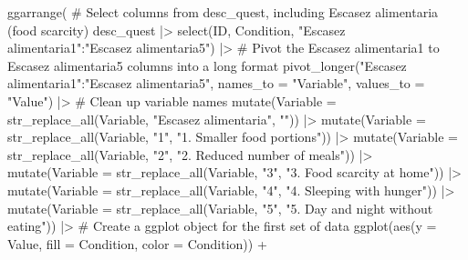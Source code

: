 \documentclass[
  bookmarksnumbered]{article}
\newenvironment{Shaded}{\begin{snugshade}}{\end{snugshade}}
\newcommand{\AttributeTok}[1]{\textcolor[rgb]{0.80,0.80,0.80}{#1}}
\newcommand{\CommentTok}[1]{\textcolor[rgb]{0.50,0.62,0.50}{#1}}
\newcommand{\FunctionTok}[1]{\textcolor[rgb]{0.94,0.94,0.56}{#1}}
\newcommand{\NormalTok}[1]{\textcolor[rgb]{0.80,0.80,0.80}{#1}}
\newcommand{\SpecialCharTok}[1]{\textcolor[rgb]{0.86,0.64,0.64}{#1}}
\newcommand{\StringTok}[1]{\textcolor[rgb]{0.80,0.58,0.58}{#1}}
\begin{document}
\begin{Shaded}
\begin{Highlighting}[]
\FunctionTok{ggarrange}\NormalTok{(}
  \CommentTok{\# Select columns from desc\_quest, including \textquotesingle{}Escasez alimentaria\textquotesingle{} (food scarcity)}
\NormalTok{  desc\_quest }\SpecialCharTok{|\textgreater{}}
    \FunctionTok{select}\NormalTok{(ID, Condition, }\StringTok{"Escasez alimentaria1"}\SpecialCharTok{:}\StringTok{"Escasez alimentaria5"}\NormalTok{) }\SpecialCharTok{|\textgreater{}}
    \CommentTok{\# Pivot the Escasez alimentaria1 to Escasez alimentaria5 columns into a long format}
    \FunctionTok{pivot\_longer}\NormalTok{(}\StringTok{"Escasez alimentaria1"}\SpecialCharTok{:}\StringTok{"Escasez alimentaria5"}\NormalTok{,}
      \AttributeTok{names\_to =} \StringTok{"Variable"}\NormalTok{,}
      \AttributeTok{values\_to =} \StringTok{"Value"}\NormalTok{) }\SpecialCharTok{|\textgreater{}}
    \CommentTok{\# Clean up variable names}
    \FunctionTok{mutate}\NormalTok{(}\AttributeTok{Variable =} \FunctionTok{str\_replace\_all}\NormalTok{(Variable, }\StringTok{"Escasez alimentaria"}\NormalTok{, }\StringTok{""}\NormalTok{)) }\SpecialCharTok{|\textgreater{}}
    \FunctionTok{mutate}\NormalTok{(}\AttributeTok{Variable =} \FunctionTok{str\_replace\_all}\NormalTok{(Variable, }\StringTok{"1"}\NormalTok{, }\StringTok{"1. Smaller food portions"}\NormalTok{)) }\SpecialCharTok{|\textgreater{}}
    \FunctionTok{mutate}\NormalTok{(}\AttributeTok{Variable =} \FunctionTok{str\_replace\_all}\NormalTok{(Variable, }\StringTok{"2"}\NormalTok{, }\StringTok{"2. Reduced number of meals"}\NormalTok{)) }\SpecialCharTok{|\textgreater{}}
    \FunctionTok{mutate}\NormalTok{(}\AttributeTok{Variable =} \FunctionTok{str\_replace\_all}\NormalTok{(Variable, }\StringTok{"3"}\NormalTok{, }\StringTok{"3. Food scarcity at home"}\NormalTok{)) }\SpecialCharTok{|\textgreater{}}
    \FunctionTok{mutate}\NormalTok{(}\AttributeTok{Variable =} \FunctionTok{str\_replace\_all}\NormalTok{(Variable, }\StringTok{"4"}\NormalTok{, }\StringTok{"4. Sleeping with hunger"}\NormalTok{)) }\SpecialCharTok{|\textgreater{}}
    \FunctionTok{mutate}\NormalTok{(}\AttributeTok{Variable =} \FunctionTok{str\_replace\_all}\NormalTok{(Variable, }\StringTok{"5"}\NormalTok{, }\StringTok{"5. Day and night without eating"}\NormalTok{)) }\SpecialCharTok{|\textgreater{}}
    \CommentTok{\# Create a ggplot object for the first set of data}
    \FunctionTok{ggplot}\NormalTok{(}\FunctionTok{aes}\NormalTok{(}\AttributeTok{y =}\NormalTok{ Value, }\AttributeTok{fill =}\NormalTok{ Condition, }\AttributeTok{color =}\NormalTok{ Condition)) }\SpecialCharTok{+}

\end{Highlighting}
\end{Shaded}
\end{document}
